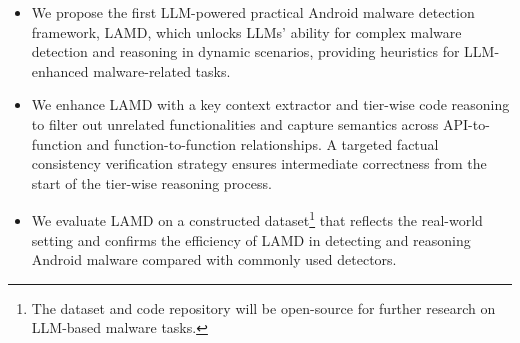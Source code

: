 \begin{itemize}
    \item We propose the first LLM-powered practical Android malware detection framework, LAMD, which unlocks LLMs' ability for complex malware detection and reasoning in dynamic scenarios, providing heuristics for LLM-enhanced malware-related tasks.
    \item We enhance LAMD with a key context extractor and tier-wise code reasoning to filter out unrelated functionalities and capture semantics across API-to-function and function-to-function relationships. A targeted factual consistency verification strategy ensures intermediate correctness from the start of the tier-wise reasoning process.
    \item We evaluate LAMD on a constructed dataset\footnote{The dataset and code repository will be open-source for further research on LLM-based malware tasks.} that reflects the real-world setting and confirms the efficiency of LAMD in detecting and reasoning Android malware compared with commonly used detectors. 
\end{itemize}









